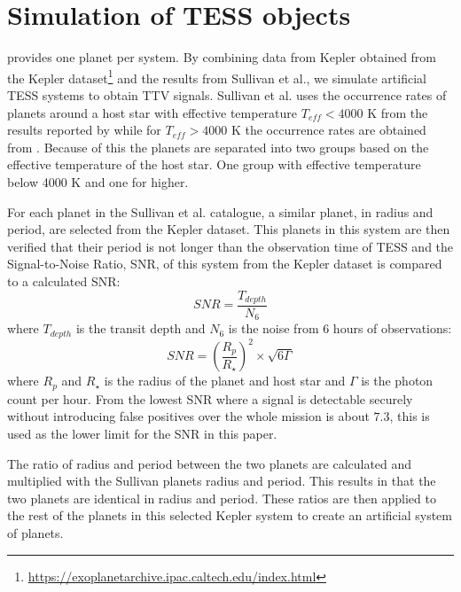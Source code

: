\documentclass[12pt]{report}
\begin{document}
\section{Simulation of TESS objects}
\label{simTESS}
	\cite{2015ApJ...809...77S} provides one planet per system. By combining data from Kepler obtained from the Kepler dataset\footnote{\url{https://exoplanetarchive.ipac.caltech.edu/index.html}} and the results from Sullivan et al., we simulate artificial TESS systems to obtain TTV signals. Sullivan et al. uses the occurrence rates of planets around a host star with effective temperature $T_{eff} < 4000$ K from the results reported by \cite{2015ApJ...807...45D} while for $T_{eff} > 4000$ K the occurrence rates are obtained from \cite{2013ApJ...766...81F}. Because of this the planets are separated into two groups based on the effective temperature of the host star. One group with effective temperature below 4000 K and one for higher.

	For each planet in the Sullivan et al. catalogue, a similar planet, in radius and period, are selected from the Kepler dataset. This planets in this system are then verified that their period is not longer than the observation time of TESS and the Signal-to-Noise Ratio, SNR, of this system from the Kepler dataset is compared to a calculated SNR:
	\begin{equation}
	SNR = \frac{T_{depth}}{N_{6}}
	\end{equation}	
	where $T_{depth}$ is the transit depth and $N_{6}$ is the noise from 6 hours of observations:
	\begin{equation}
	SNR = \left(\frac{R_p}{R_{\star}}\right)^2 \times \sqrt{6\Gamma}
	\end{equation}
	where $R_p$ and $R_{\star}$ is the radius of the planet and host star and $\Gamma$ is the photon count per hour. From \cite{2015ApJ...809...77S} the lowest SNR where a signal is detectable securely without introducing false positives over the whole mission is about $7.3$, this is used as the lower limit for the SNR in this paper.
	
	The ratio of radius and period between the two planets are calculated and multiplied with the Sullivan planets radius and period. This results in that the two planets are identical in radius and period. These ratios are then applied to the rest of the planets in this selected Kepler system to create an artificial system of planets.  
	
\end{document}
